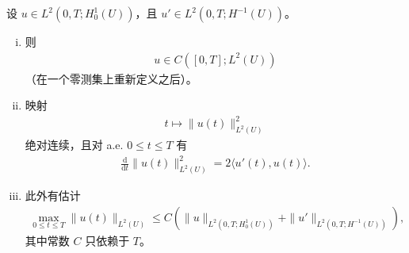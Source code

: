 \documentclass[../../main.tex]{subfiles}
\begin{document}
\begin{theorem}[更多微积分]\label{theorem:ch05-更多微积分}设 $u\in L^{2}(0,T;H^{1}_{0}(U))$，且 $u'\in L^{2}(0,T;H^{-1}(U))$。
\begin{enumerate}[(i)]
\item 则
\begin{align*}
u\in C([0,T];L^{2}(U))
\end{align*}
（在一个零测集上重新定义之后）。
\item 映射
\begin{align*}
t\mapsto\|u(t)\|_{L^{2}(U)}^{2}
\end{align*}
绝对连续，且对 a.e. $0\leqslant t\leqslant T$ 有
\begin{align*}
\frac{\mathrm{d}}{\mathrm{d}t}\|u(t)\|_{L^{2}(U)}^{2}=2\langle u'(t),u(t)\rangle.
\end{align*}
\item 此外有估计
\begin{align}
\max_{0\leqslant t\leqslant T}\|u(t)\|_{L^{2}(U)}
\leqslant C\left(\|u\|_{L^{2}(0,T;H^{1}_{0}(U))}+\|u'\|_{L^{2}(0,T;H^{-1}(U))}\right),
\end{align}
其中常数 $C$ 只依赖于 $T$。
\end{enumerate}
\end{theorem}
\end{document}
